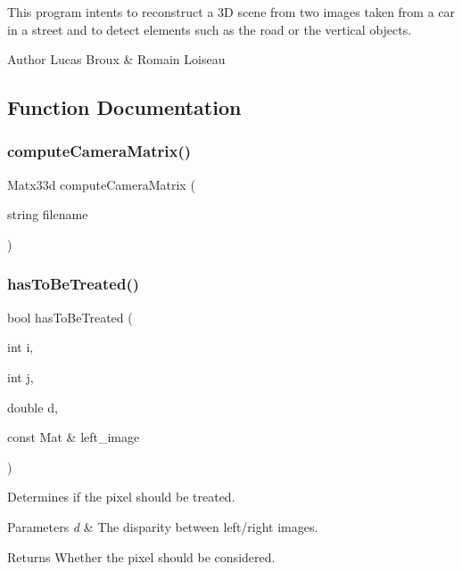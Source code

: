 This program intents to reconstruct a 3D scene from two images taken from a car in a street and to detect elements such as the road or the vertical objects. 

\begin{DoxyAuthor}{Author}
Lucas Broux \& Romain Loiseau 
\end{DoxyAuthor}


\subsection{Function Documentation}
\mbox{\label{projet_8cpp_a1f8408470f1a60580531a6f03b8d37bb}} 
\subsubsection{compute\+Camera\+Matrix()}
{\footnotesize\ttfamily Matx33d compute\+Camera\+Matrix (\begin{DoxyParamCaption}\item[{string}]{filename }\end{DoxyParamCaption})}

\mbox{\label{projet_8cpp_a51661db0d98d3b889acb2cc3aab03837}} 
\subsubsection{has\+To\+Be\+Treated()}
{\footnotesize\ttfamily bool has\+To\+Be\+Treated (\begin{DoxyParamCaption}\item[{int}]{i,  }\item[{int}]{j,  }\item[{double}]{d,  }\item[{const Mat \&}]{left\+\_\+image }\end{DoxyParamCaption})\hspace{0.3cm}{\ttfamily [inline]}}



Determines if the pixel should be treated. 


\begin{DoxyParams}{Parameters}
{\em d} & The disparity between left/right images. \\
\hline
\end{DoxyParams}
\begin{DoxyReturn}{Returns}
Whether the pixel should be considered. 
\end{DoxyReturn}
\mbox{\label{projet_8cpp_ae66f6b31b5ad750f1fe042a706a4e3d4}} 
